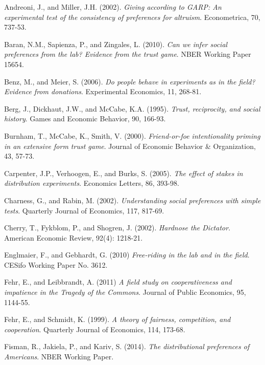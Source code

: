\documentclass[12pt]{article}
\begin{document}
 \newpage
\begin{thebibliography}{9}

Andreoni, J., and Miller, J.H. (2002).
\textit{Giving according to GARP: An experimental test of the consistency of preferences for altruism}.
Econometrica, 70, 737-53.

Baran, N.M., Sapienza, P., and Zingales, L. (2010).
\textit{Can we infer social preferences from the lab? Evidence from the trust game}.
NBER Working Paper 15654.

Benz, M., and Meier, S. (2006).
\textit{Do people behave in experiments as in the field? Evidence from donations}.
Experimental Economics, 11, 268-81.

Berg, J., Dickhaut, J.W., and McCabe, K.A. (1995).
\textit{Trust, reciprocity, and social history}.
Games and Economic Behavior, 90, 166-93.

Burnham, T., McCabe, K., Smith, V. (2000).
\textit{Friend-or-foe intentionality priming in an extensive form trust game}.
Journal of Economic Behavior \& Organization, 43, 57-73.

Carpenter, J.P., Verhoogen, E., and Burks, S. (2005).
\textit{The effect of stakes in distribution experiments}.
Economics Letters, 86, 393-98.

Charness, G., and Rabin, M. (2002).
\textit{Understanding social preferences with simple tests}.
Quarterly Journal of Economics, 117, 817-69.

Cherry, T., Fykblom, P., and Shogren, J. (2002).
\textit{Hardnose the Dictator}.
American Economic Review, 92(4): 1218-21.

Englmaier, F., and Gebhardt, G. (2010)
\textit{Free-riding in the lab and in the field}.
CESifo Working Paper No. 3612.

Fehr, E., and Leibbrandt, A. (2011)
\textit{A field study on cooperativeness and impatience in the Tragedy of the Commons}.
Journal of Public Economics, 95, 1144-55.

Fehr, E., and Schmidt, K. (1999).
\textit{A theory of fairness, competition, and cooperation}.
Quarterly Journal of Economics, 114, 173-68.

Fisman, R., Jakiela, P., and Kariv, S. (2014).
\textit{The distributional preferences of Americans}.
NBER Working Paper.


\end{thebibliography}
\end{document}
